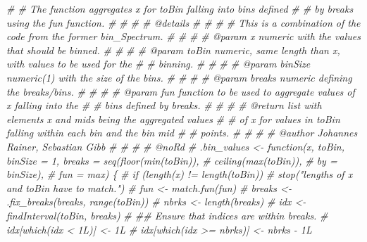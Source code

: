 \documentclass[
]{article}
\newenvironment{Shaded}{\begin{snugshade}}{\end{snugshade}}
\newcommand{\CommentTok}[1]{\textcolor[rgb]{0.56,0.35,0.01}{\textit{#1}}}
\begin{document}
\begin{Shaded}
\begin{Highlighting}[]
\CommentTok{\# \#\textquotesingle{} The function aggregates \textasciigrave{}x\textasciigrave{} for \textasciigrave{}toBin\textasciigrave{} falling into bins defined}
\CommentTok{\# \#\textquotesingle{} by \textasciigrave{}breaks\textasciigrave{} using the \textasciigrave{}fun\textasciigrave{} function.}
\CommentTok{\# \#\textquotesingle{}}
\CommentTok{\# \#\textquotesingle{} @details}
\CommentTok{\# \#\textquotesingle{}}
\CommentTok{\# \#\textquotesingle{} This is a combination of the code from the former bin\_Spectrum.}
\CommentTok{\# \#\textquotesingle{}}
\CommentTok{\# \#\textquotesingle{} @param x \textasciigrave{}numeric\textasciigrave{} with the values that should be binned.}
\CommentTok{\# \#\textquotesingle{}}
\CommentTok{\# \#\textquotesingle{} @param toBin \textasciigrave{}numeric\textasciigrave{}, same length than \textasciigrave{}x\textasciigrave{}, with values to be used for the}
\CommentTok{\# \#\textquotesingle{}     binning.}
\CommentTok{\# \#\textquotesingle{}}
\CommentTok{\# \#\textquotesingle{} @param binSize \textasciigrave{}numeric(1)\textasciigrave{} with the size of the bins.}
\CommentTok{\# \#\textquotesingle{}}
\CommentTok{\# \#\textquotesingle{} @param breaks \textasciigrave{}numeric\textasciigrave{} defining the breaks/bins.}
\CommentTok{\# \#\textquotesingle{}}
\CommentTok{\# \#\textquotesingle{} @param fun \textasciigrave{}function\textasciigrave{} to be used to aggregate values of \textasciigrave{}x\textasciigrave{} falling into the}
\CommentTok{\# \#\textquotesingle{}     bins defined by \textasciigrave{}breaks\textasciigrave{}.}
\CommentTok{\# \#\textquotesingle{}}
\CommentTok{\# \#\textquotesingle{} @return \textasciigrave{}list\textasciigrave{} with elements \textasciigrave{}x\textasciigrave{} and \textasciigrave{}mids\textasciigrave{} being the aggregated values}
\CommentTok{\# \#\textquotesingle{}     of \textasciigrave{}x\textasciigrave{} for values in \textasciigrave{}toBin\textasciigrave{} falling within each bin and the bin mid}
\CommentTok{\# \#\textquotesingle{}     points.}
\CommentTok{\# \#\textquotesingle{}}
\CommentTok{\# \#\textquotesingle{} @author Johannes Rainer, Sebastian Gibb}
\CommentTok{\# \#\textquotesingle{}}
\CommentTok{\# \#\textquotesingle{} @noRd}
\CommentTok{\# .bin\_values \textless{}{-} function(x, toBin, binSize = 1, breaks = seq(floor(min(toBin)),}
\CommentTok{\#                                                             ceiling(max(toBin)),}
\CommentTok{\#                                                             by = binSize),}
\CommentTok{\#                         fun = max) \{}
\CommentTok{\#     if (length(x) != length(toBin))}
\CommentTok{\#         stop("lengths of \textquotesingle{}x\textquotesingle{} and \textquotesingle{}toBin\textquotesingle{} have to match.")}
\CommentTok{\#     fun \textless{}{-} match.fun(fun)}
\CommentTok{\#     breaks \textless{}{-} .fix\_breaks(breaks, range(toBin))}
\CommentTok{\#     nbrks \textless{}{-} length(breaks)}
\CommentTok{\#     idx \textless{}{-} findInterval(toBin, breaks)}
\CommentTok{\#     \#\# Ensure that indices are within breaks.}
\CommentTok{\#     idx[which(idx \textless{} 1L)] \textless{}{-} 1L}
\CommentTok{\#     idx[which(idx \textgreater{}= nbrks)] \textless{}{-} nbrks {-} 1L}


\end{Highlighting}
\end{Shaded}
\end{document}
